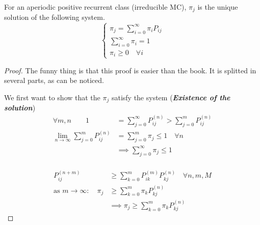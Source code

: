 	\begin{theorem}[1.3 (K.T. pp 85-86)]
		For an aperiodic positive recurrent class (irreducible MC), $\pi_j$ is the unique solution of the following system.
		\begin{equation*}\begin{cases}
			\pi_j = \sum\limits_{i=0}^\infty \pi_i P_{ij} \\
			\sum\limits_{i=0}^\infty \pi_i = 1 \\
			\pi_i \geq 0 \quad \forall i
		\end{cases}\end{equation*}
	\end{theorem}

	\begin{proof} The funny thing is that this proof is easier than the book.
		It is splitted in several parts, as can be noticed.

		\proofpart
			We first want to show that the $\pi_j$ satisfy the system (\textbf{\textit{Existence of the solution}})
			\begin{equation*}
				\begin{split}
					\forall m,n \qquad 1&=\sum\limits_{j=0}^\infty P_{ij}^{(n)} > \sum\limits_{j=0}^m P_{ij}^{(n)}\\
	 			 \lim_{n\to\infty} \sum\limits_{j=0}^m P_{ij}^{(n)} &= \sum\limits_{j=0}^m \pi_j \leq 1 \quad \forall n \\
				 &\implies \sum\limits_{j=0}^\infty \pi_j \leq 1\\
				\end{split}
			\end{equation*}

		\proofpart
			\begin{equation*}
				\begin{split}
					P_{ij}^{(n+m)} &\geq \sum\limits_{k=0}^m P_{ik}^{(m)} P_{kj}^{(n)} \quad \forall n, m, M\\
					\text{as } m \to \infty :\quad \pi_j &\geq \sum\limits_{k=0}^m \pi_k P_{kj}^{(n)}\\
					&\implies  \pi_j \geq \sum\limits_{k=0}^m \pi_k P_{kj}^{(n)}
				\end{split}
			\end{equation*}


\end{proof}
